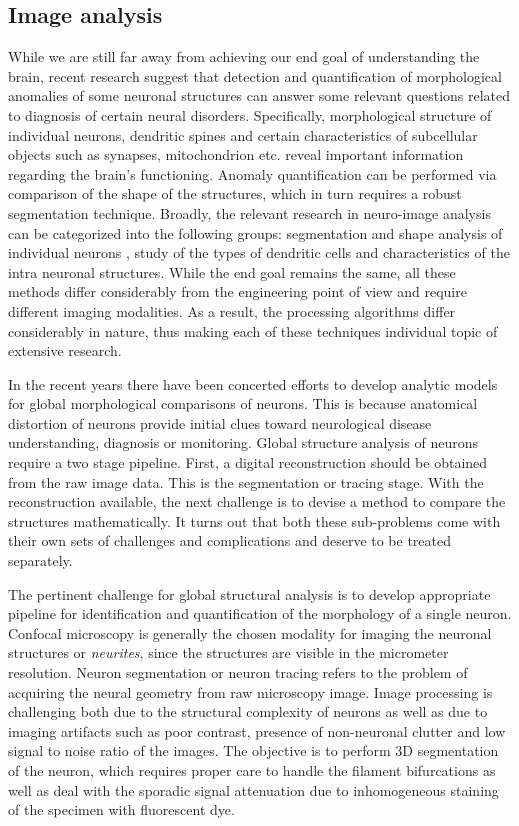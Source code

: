 \subsection{Image analysis}
While we are still far away from achieving our end goal of understanding the brain, recent research suggest that detection and quantification of morphological anomalies of some neuronal structures can answer some relevant questions related to diagnosis of certain neural disorders. Specifically, morphological structure of individual neurons, dendritic spines and certain characteristics of subcellular objects such as synapses, mitochondrion etc. reveal important information regarding the brain’s functioning. Anomaly quantification can be performed via comparison of the shape of the structures, which in turn requires a robust segmentation technique. Broadly, the relevant research in neuro-image analysis can be categorized into the following groups: segmentation and shape analysis of individual neurons \cite{dima_wavalet,mukherjee_T2T_2,mukherjee_TuFF,rodriguez_voxelscoop,peng_GAD}, study of the types of dendritic cells and characteristics of the intra neuronal structures\cite{5613939,6008641,6971126,EMmembrane_nguyen}. While the end goal remains the same, all these methods differ considerably from the engineering point of view and require different imaging modalities. As a result, the processing algorithms differ considerably in nature, thus making each of these techniques individual topic of extensive research.

In the recent years there have been concerted efforts to develop analytic models for global morphological comparisons of neurons. This is because anatomical distortion of neurons provide initial clues toward neurological disease understanding, diagnosis or  monitoring. Global structure analysis of neurons require a two stage pipeline. First, a digital reconstruction should be obtained from the raw image data. This is the segmentation or tracing stage. With the reconstruction available, the next challenge is to devise a method to compare the structures mathematically. It turns out that both these sub-problems come with their own sets of challenges and complications and deserve to be treated separately. 

The pertinent challenge for global structural analysis is to develop appropriate pipeline for identification and quantification of the morphology of a single neuron. Confocal microscopy is generally the chosen modality for imaging the neuronal structures or \textit{neurites}, since the structures are visible in the micrometer resolution. Neuron segmentation or neuron tracing refers to the problem of acquiring the neural geometry from raw microscopy image.  Image processing is challenging both due to the structural complexity of neurons as well as due to imaging artifacts such as poor contrast, presence of non-neuronal clutter and low signal to noise ratio of the images. The objective is to perform 3D segmentation of the neuron, which requires proper care to handle the filament bifurcations as well as deal with the sporadic signal attenuation due to inhomogeneous staining of the specimen with fluorescent dye. 

